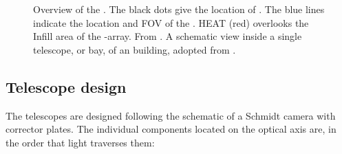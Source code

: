 \begin{figure}[t]
  \centering
  \hspace{0.2cm}
  \caption[]{ Overview of the \PAO. The black dots give the 
  location of \WCDs. The blue lines indicate the location and FOV of the \FD. 
  HEAT (red) overlooks the Infill area of the \SD-array. From \cite{darkoWebsite}. 
   A schematic view inside a single telescope, or bay, 
	of an \FD building, adopted from \cite{}.}
  \label{fig:pao-images}
\end{figure}


\subsection{Telescope design}
\label{ssec:fd-design}

The \FD telescopes are designed following the schematic of a Schmidt camera with 
corrector plates. The individual components located on the optical axis are, in 
the order that light traverses them:

